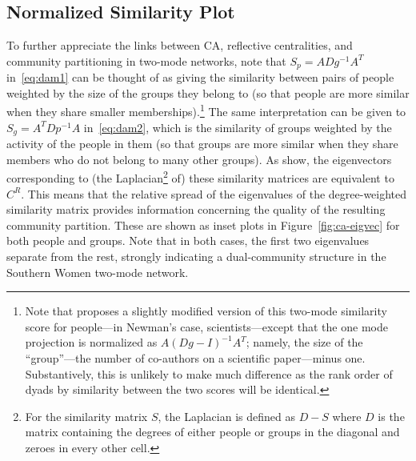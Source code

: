 \documentclass[a4paper,fleqn]{cas-sc}
\begin{document}
\subsection{Normalized Similarity Plot} \label{subsec:normsim}
To further appreciate the links between CA, reflective centralities, and community partitioning in two-mode networks, note that $S_p = ADg^{-1}A^T$ in~\ref{eq:dam1} can be thought of as giving the similarity between pairs of people weighted by the size of the groups they belong to (so that people are more similar when they share smaller memberships).\footnote{Note that \citet[eq.2]{newman2001scientific} proposes a slightly modified version of this two-mode similarity score for people---in Newman's case, scientists---except that the one mode projection is normalized as $A(Dg - I)^{-1}A^T$; namely, the size of the ``group''---the number of co-authors on a scientific paper---minus one. Substantively, this is unlikely to make much difference as the rank order of dyads by similarity between the two scores will be identical.} The same interpretation can be given to $S_g = A^TDp^{-1}A$ in~\ref{eq:dam2}, which is the similarity of groups weighted by the activity of the people in them (so that groups are more similar when they share members who do not belong to many other groups). As \citet{van2021correspondence} show, the eigenvectors corresponding to (the Laplacian\footnote{For the similarity matrix $S$, the Laplacian is defined as $D-S$ where $D$ is the matrix containing the degrees of either people or groups in the diagonal and zeroes in every other cell.} of) these similarity matrices are equivalent to $C^R$. This means that the relative spread of the eigenvalues of the degree-weighted similarity matrix provides information concerning the quality of the resulting community partition. These are shown as inset plots in Figure~\ref{fig:ca-eigvec} for both people and groups. Note that in both cases, the first two eigenvalues separate from the rest, strongly indicating a dual-community structure in the Southern Women two-mode network. 
\end{document}
